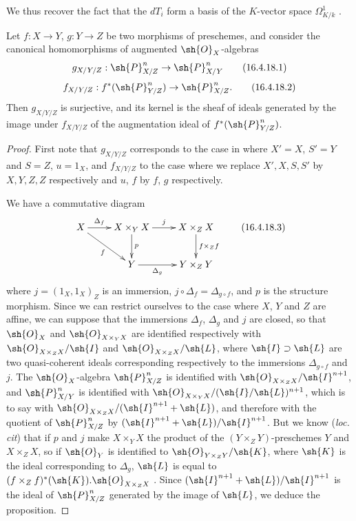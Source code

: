 We thus recover the fact that the $dT_i$ form a basis of the $K$-vector space $\Omega_{K/k}^1$ .

\begin{env}[16.4.18]
\label{IV.16.4.18}
Let $f:X \to Y$, $g:Y \to Z$ be two morphisms of preschemes, and consider the canonical homomorphisms of augmented $\sh{O}_X$-algebras 
\[
  \label{IV.16.4.18.1}
  g_{X/Y/Z}:\sh{P}_{X/Z}^n \to \sh{P}_{X/Y}^n
  \tag{16.4.18.1}
\]
\[
  \label{IV.16.4.18.2}
  f_{X/Y/Z}:f^*(\sh{P}_{Y/Z}^n) \to \sh{P}_{X/Z}^n.
  \tag{16.4.18.2}
\]
Then $g_{X/Y/Z}$ is surjective, and its kernel is the sheaf of ideals generated by the image under $f_{X/Y/Z}$ of the augmentation ideal of $f^*(\sh{P}_{Y/Z}^n)$.
\end{env}

\begin{proof}
First note that $g_{X/Y/Z}$ corresponds to the case in  where $X' = X$, $S' = Y$ and $S = Z$, $u = 1_X$, and $f_{X/Y/Z}$ to the case where we replace $X', X, S, S'$ by $X, Y, Z, Z$ respectively and $u$, $f$ by $f$, $g$ respectively.

We have a commutative diagram 
\[
  \label{IV.16.4.18.3}
  \xymatrix{
    X \ar[r]^-{\Delta_f} \ar[dr]_-f & X \times_Y X \ar[d]^-p \ar[r]^-j & X \times_Z X \ar[d]^-{f \times_Z f} \\
    &   Y \ar[r]_-{\Delta_g}  & Y \times_Z Y
  }
  \tag{16.4.18.3}
\] 
where $j = (1_X, 1_X)_Z$ is an immersion, $j \circ \Delta_f = \Delta_{g \circ f}$, and $p$ is the structure morphism.
Since we can restrict ourselves to the case where $X$, $Y$ and $Z$ are affine, we can suppose that the immersions $\Delta_f$, $\Delta_g$ and $j$ are closed, so that $\sh{O}_X$ and $\sh{O}_{X \times_Y X}$ are identified respectively with $\sh{O}_{X \times_Z X} / \sh{I}$ and $\sh{O}_{X \times_Z X}/\sh{L}$, where $\sh{I} \supset \sh{L}$ are two quasi-coherent ideals corresponding respectively to the immersions $\Delta_{g \circ f} $ and $j$.
The $\sh{O}_X$-algebra $\sh{P}_{X/Z}^n$ is identified with $\sh{O}_{X \times_Z X} / \sh{I}^{n+1}$, and $\sh{P}_{X/Y}^n$ is identified with $\sh{O}_{X \times_Y X}/(\sh{I}/\sh{L})^{n+1}$, which is to say with $\sh{O}_{X \times_Z X}/(\sh{I}^{n+1} + \sh{L})$, and therefore with the quotient of $\sh{P}_{X/Z}^n$ by $(\sh{I}^{n+1} + \sh{L})/\sh{I}^{n+1}$.
But we know (\emph{loc. cit}) that if $p$ and $j$ make $X \times_Y X$ the product of the $(Y \times_Z Y)$-preschemes $Y$ and $X \times_Z X$, so if $\sh{O}_Y$ is identified to $\sh{O}_{Y \times_Z Y}/\sh{K}$, where $\sh{K}$ is the ideal corresponding to $\Delta_g$, $\sh{L}$ is equal to $(f\times_Z f)^*(\sh{K}).\sh{O}_{X \times_Z X}$ .
Since $(\sh{I}^{n+1} + \sh{L})/\sh{I}^{n+1}$ is the ideal of $\sh{P}_{X/Z}^n$ generated by the image of $\sh{L}$, we deduce the proposition.
\end{proof}

